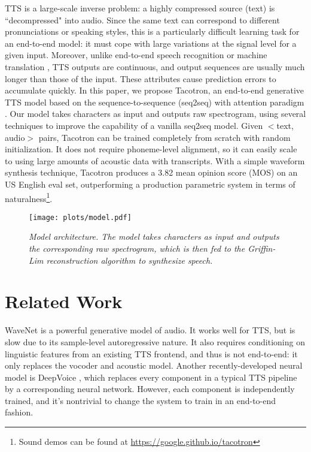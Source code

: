 \documentclass{article} \usepackage{iclr2017_conference,times}
\begin{document}
TTS is a large-scale inverse problem: a highly compressed source (text) is ``decompressed" into audio. Since the same text can correspond to different pronunciations or speaking styles, this is a particularly difficult learning task for an end-to-end model: it must cope with large variations at the signal level for a given input. Moreover, unlike end-to-end speech recognition \citep{chan2016listen} or machine translation \citep{wu2016google}, TTS outputs are continuous, and output sequences are usually much longer than those of the input. These attributes cause prediction errors to accumulate quickly. In this paper, we propose Tacotron, an end-to-end generative TTS model based on the sequence-to-sequence (seq2seq) \citep{sutskever2014sequence} with attention paradigm \citep{bahdanau2014neural}. Our model takes characters as input and outputs raw spectrogram, using several techniques to improve the capability of a vanilla seq2seq model. Given $<$text, audio$>$ pairs, Tacotron can be trained completely from scratch with random initialization. It does not require phoneme-level alignment, so it can easily scale to using large amounts of acoustic data with transcripts. With a simple waveform synthesis technique, Tacotron produces a 3.82 mean opinion score (MOS) on an US English eval set, outperforming a production parametric system in terms of naturalness\footnote{Sound demos can be found at \url{https://google.github.io/tacotron}}.


\begin{figure*}[t]
\centering
\texttt{[image: plots/model.pdf]}
\caption{{\it Model architecture. The model takes characters as input and outputs the corresponding raw spectrogram, which is then fed to the Griffin-Lim reconstruction algorithm to synthesize speech.}}
\label{fig:model}
\end{figure*}


\section{Related Work}
WaveNet \citep{van2016wavenet} is a powerful generative model of audio. It works well for TTS, but is slow due to its sample-level autoregressive nature. It also requires conditioning on linguistic features from an existing TTS frontend, and thus is not end-to-end: it only replaces the vocoder and acoustic model. Another recently-developed neural model is DeepVoice \citep{arik2017deep}, which replaces every component in a typical TTS pipeline by a corresponding neural network. However, each component is independently trained, and it's nontrivial to change the system to train in an end-to-end fashion.
\end{document}
